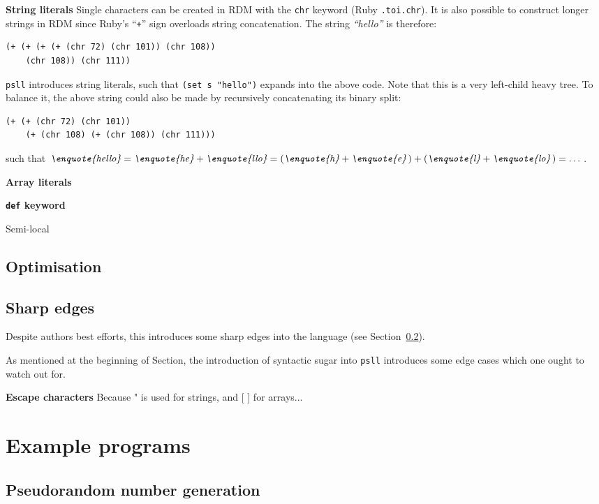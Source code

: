 \documentclass[aip,jcp,reprint,footinbib]{revtex4-1}
\let\tt\texttt
\newcommand\psll{\texttt{psll}\xspace}
\newcommand{\ilpsll}[1]{\lstinline[language=psll,columns=flexible]{#1}}
\begin{document}
\textbf{String literals} Single characters can be created in RDM with the \tt{chr} keyword (Ruby \tt{.to\textunderscore{}i.chr}). It is also possible to construct longer strings in RDM since Ruby's \enquote{\tt{+}} sign overloads string concatenation. The string \textit{\enquote{hello}} is therefore:
\begin{lstlisting}[language=psll,aboveskip=3pt,belowskip=-2pt]
(+ (+ (+ (+ (chr 72) (chr 101)) (chr 108))
	(chr 108)) (chr 111))
\end{lstlisting}
\psll introduces string literals, such that \ilpsll{(set s "hello")} expands into the above code. Note that this is a very left-child heavy tree. To balance it, the above string could also be made by recursively concatenating its binary split:
\begin{lstlisting}[language=psll,aboveskip=3pt,belowskip=-2pt]
(+ (+ (chr 72) (chr 101))
	(+ (chr 108) (+ (chr 108)) (chr 111)))
\end{lstlisting}
such that $\textit{\enquote{hello}} = \textit{\enquote{he}} + \textit{\enquote{llo}} = \left(\textit{\enquote{h}} + \textit{\enquote{e}}\,\right) + \left(\textit{\enquote{l}} + \textit{\enquote{lo}}\,\right) = \dots$.

\textbf{Array literals}

\textbf{\tt{def} keyword}

Semi-local
\subsection{Optimisation}

\subsection{Sharp edges}\label{sec:sharp_edges}


Despite authors best efforts, this introduces some sharp edges into the language (see Section~\ref{sec:sharp_edges}).


As mentioned at the beginning of Section, the introduction of syntactic sugar into \psll introduces some edge cases which one ought to watch out for.

\textbf{Escape characters}
Because " is used for strings, and [ ] for arrays...


\section{Example programs}
\subsection{Pseudorandom number generation}
\end{document}
